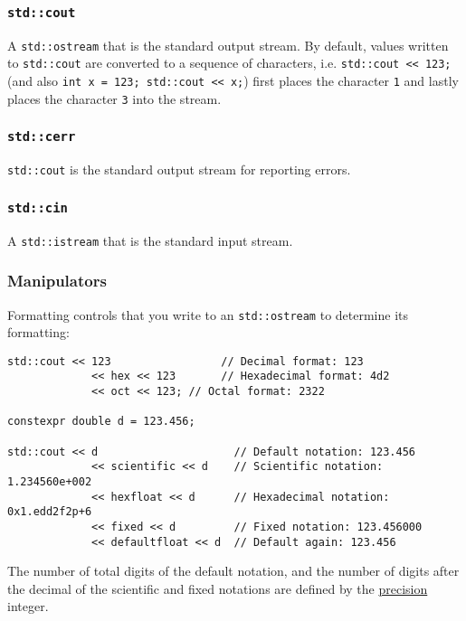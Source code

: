 \documentclass[8pt, table, xcdraw]{article}%
\begin{document}
\subsubsection{\lstinline{std::cout}}

A \lstinline{std::ostream} that is the standard output stream. By default, values written to \lstinline{std::cout} are converted to a sequence of characters, i.e. \lstinline{std::cout << 123;} (and also \lstinline{int x = 123; std::cout << x;}) first places the character \lstinline{1} and lastly places the character \lstinline{3} into the stream. 

\subsubsection{\lstinline{std::cerr}}

\lstinline{std::cout} is the standard output stream for reporting errors.

\subsubsection{\lstinline{std::cin}}

A \lstinline{std::istream} that is the standard input stream.

\subsubsection{Manipulators} \label{manipulators}

Formatting controls that you write to an \lstinline{std::ostream} to determine its formatting:

\begin{lstlisting}
std::cout << 123                 // Decimal format: 123
             << hex << 123       // Hexadecimal format: 4d2
             << oct << 123; // Octal format: 2322
          
constexpr double d = 123.456;

std::cout << d                     // Default notation: 123.456
             << scientific << d    // Scientific notation: 1.234560e+002
             << hexfloat << d      // Hexadecimal notation: 0x1.edd2f2p+6
             << fixed << d         // Fixed notation: 123.456000
             << defaultfloat << d  // Default again: 123.456
\end{lstlisting}

The number of total digits of the  default notation, and the number of digits after the decimal of the scientific and fixed notations are defined by the \hyperref[precision]{precision} integer.
\end{document}
